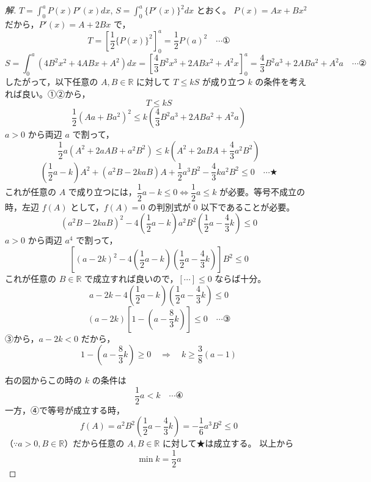 \documentclass[../main.tex]{subfiles}
\begin{document}
\begin{proof}[解]
  $T = \displaystyle\int_0^a P(x)P'(x)dx$, $S = \displaystyle\int_0^a \{P'(x)\}^2 dx$ とおく。
  $P(x)=Ax+Bx^2$ だから，$P'(x)=A+2Bx$ で，
  \[
    T = \left[\frac{1}{2}\{P(x)\}^2\right]_0^a = \frac{1}{2}P(a)^2 \quad \cdots \text{①}
  \]
  \[
    S = \int_0^a (4B^2x^2+4ABx+A^2)dx = \left[\frac{4}{3}B^2x^3+2ABx^2+A^2x\right]_0^a = \frac{4}{3}B^2a^3+2ABa^2+A^2a \quad \cdots \text{②}
  \]
  したがって，以下任意の $A,B\in\mathbb{R}$ に対して $T\le kS$ が成り立つ $k$ の条件を考えれば良い。①②から，
  \[
    T \le kS
  \]
  \[
    \frac{1}{2}(Aa+Ba^2)^2 \le k\left(\frac{4}{3}B^2a^3+2ABa^2+A^2a\right)
  \]
  $a>0$ から両辺 $a$ で割って，
  \[
    \frac{1}{2}a(A^2+2aAB+a^2B^2) \le k\left(A^2+2aBA+\frac{4}{3}a^2B^2\right)
  \]
  \[
    \left(\frac{1}{2}a-k\right)A^2 + (a^2B-2kaB)A + \frac{1}{2}a^3B^2 - \frac{4}{3}ka^2B^2 \le 0 \quad \cdots \bigstar
  \]
  これが任意の $A$ で成り立つには，$\dfrac{1}{2}a-k\le0 \iff \dfrac{1}{2}a\le k$ が必要。等号不成立の時，左辺 $f(A)$ として，$f(A)=0$ の判別式が $0$ 以下であることが必要。
  \[
    (a^2B-2kaB)^2 - 4\left(\frac{1}{2}a-k\right)a^2B^2\left(\frac{1}{2}a-\frac{4}{3}k\right) \le 0
  \]
  $a>0$ から両辺 $a^4$ で割って，
  \[
    \left[(a-2k)^2 - 4\left(\frac{1}{2}a-k\right)\left(\frac{1}{2}a-\frac{4}{3}k\right)\right]B^2 \le 0
  \]
  これが任意の $B\in\mathbb{R}$ で成立すれば良いので，$[\cdots]\le0$ ならば十分。
  \[
    a-2k-4\left(\frac{1}{2}a-k\right)\left(\frac{1}{2}a-\frac{4}{3}k\right) \le 0
  \]
  \[
    (a-2k)\left[1-\left(a-\frac{8}{3}k\right)\right] \le 0 \quad \cdots \text{③}
  \]
  ③から，$a-2k<0$ だから，
  \[
    1-\left(a-\frac{8}{3}k\right) \ge 0 \quad\Longrightarrow\quad k \ge \frac{3}{8}(a-1)
  \]

  \begin{center}
  \end{center}

  右の図からこの時の $k$ の条件は
  \[
    \frac{1}{2}a < k \quad \cdots \text{④}
  \]
  一方，④で等号が成立する時，
  \[
    f(A) = a^2B^2\left(\frac{1}{2}a-\frac{4}{3}k\right) = -\frac{1}{6}a^3B^2 \le 0
  \]
  （$\because a>0, B\in\mathbb{R}$）だから任意の $A,B\in\mathbb{R}$ に対して★は成立する。
  以上から
  \[
    \min k = \frac{1}{2}a
  \]
\end{proof}
\end{document}
